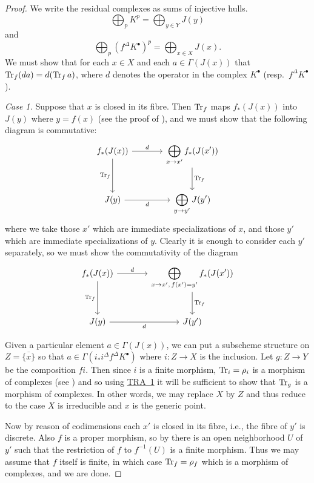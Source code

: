 \begin{proof}
We write the residual complexes as sums of injective hulls.
\[
\bigoplus_p K^{p} = \bigoplus_{y \in Y} J(y)
\]
and
\[
\bigoplus_p (f^{\Delta}K^{\bullet})^{p} = \bigoplus_{x \in X} J(x).
\]
We must show that for each $x \in X$ and each $a \in \Gamma(J(x))$ that $\operatorname{Tr}_{f}(da) = d(\operatorname{Tr}_{f} a)$, where $d$ denotes the operator in the complex $K^{\bullet}$ (resp.\ $f^{\Delta}K^{\bullet}$).

\medskip\noindent\textit{Case 1.} Suppose that $x$ is closed in its fibre. Then $\operatorname{Tr}_{f}$ maps $f_{*}(J(x))$ into $J(y)$ where $y = f(x)$ (see the proof of ), and we must show that the following diagram is commutative:
\[
\begin{tikzcd}[row sep=large, column sep=large]
f_{*}(J(x)) \ar[r,"d"] \ar[d,"\Tr_{f}"'] & \displaystyle\bigoplus_{x\rightarrow x'} f_{*}(J(x')) \ar[d,"\Tr_{f}"] \\
J(y) \ar[r,"d"'] & \displaystyle\bigoplus_{y\rightarrow y'} J(y')
\end{tikzcd}
\]
where we take those $x'$ which are immediate specializations of $x$, and those $y'$ which are immediate specializations of $y$. Clearly it is enough to consider each $y'$ separately, so we must show the commutativity of the diagram
\[
\begin{tikzcd}[row sep=large, column sep=large]
f_{*}(J(x)) \ar[r,"d"] \ar[d,"\Tr_{f}"'] & \displaystyle\bigoplus_{x \rightarrow x',\, f(x')=y'} f_{*}(J(x')) \ar[d,"\Tr_{f}"] \\
J(y) \ar[r,"d"'] & J(y')
\end{tikzcd}
\]

Given a particular element $a \in \Gamma(J(x))$, we can put a subscheme structure on $Z = \overline{\{x\}}$ so that $a \in \Gamma(i_{*}i^{\Delta}f^{\Delta}K^{\bullet})$ where $i: Z \to X$ is the inclusion. Let $g: Z \to Y$ be the composition $fi$. Then since $i$ is a finite morphism, $\operatorname{Tr}_{i} = \rho_{i}$ is a morphism of complexes (see ) and so using \hyperref[tra:6.4.1]{TRA~1} it will be sufficient to show that $\operatorname{Tr}_{g}$ is a morphism of complexes. In other words, we may replace $X$ by $Z$ and thus reduce to the case $X$ is irreducible and $x$ is the generic point.

Now by reason of codimensions  each $x'$ is closed in its fibre, i.e., the fibre of $y'$ is discrete. Also $f$ is a proper morphism, so by \cite[\nopp III,~4.4.11]{EGA} there is an open neighborhood $U$ of $y'$ such that the restriction of $f$ to $f^{-1}(U)$ is a finite morphism. Thus we may assume that $f$ itself is finite, in which case $\operatorname{Tr}_{f} = \rho_{f}$ which is a morphism of complexes, and we are done.


\end{proof}
